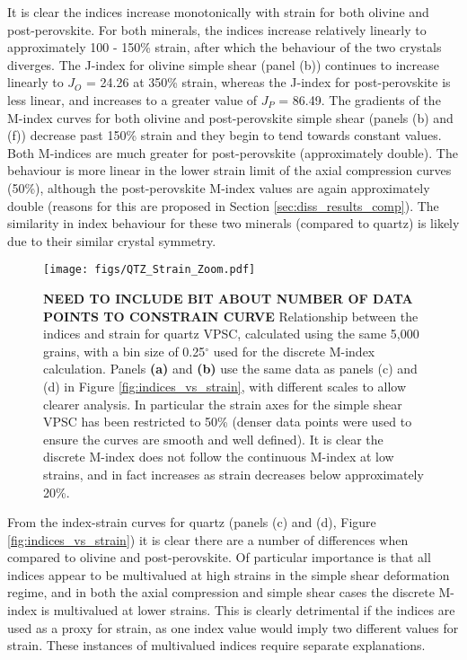 \documentclass[a4paper,12pt,twoside]{report}
\numberwithin{equation}{chapter}
\begin{document}
It is clear the indices increase monotonically with strain for both olivine and post-perovskite. For both minerals, the indices increase relatively linearly to approximately 100 - 150\% strain, after which the behaviour of the two crystals diverges. The J-index for olivine simple shear (panel (b)) continues to increase linearly to $J_O$ = 24.26 at 350\% strain, whereas the J-index for post-perovskite is less linear, and increases to a greater value of $J_P$ = 86.49. The gradients of the M-index curves for both olivine and post-perovskite simple shear (panels (b) and (f)) decrease past 150\% strain and they begin to tend towards constant values. Both M-indices are much greater for post-perovskite (approximately double). The behaviour is more linear in the lower strain limit of the axial compression curves (50\%), although the post-perovskite M-index values are again approximately double (reasons for this are proposed in Section \ref{sec:diss_results_comp}). The similarity in index behaviour for these two minerals (compared to quartz) is likely due to their similar crystal symmetry.

\begin{figure}[h]
  \centering
    \texttt{[image: figs/QTZ\_Strain\_Zoom.pdf]}
  \caption[Relation of indices to strain (quartz VPSC)]{\textbf{NEED TO INCLUDE BIT ABOUT NUMBER OF DATA POINTS TO CONSTRAIN CURVE} Relationship between the indices and strain for quartz VPSC, calculated using the same 5,000 grains, with a bin size of 0.25$^\circ$ used for the discrete M-index calculation. Panels \textbf{(a)} and \textbf{(b)} use the same data as panels (c) and (d) in Figure \ref{fig:indices_vs_strain}, with different scales to allow clearer analysis. In particular the strain axes for the simple shear VPSC has been restricted to 50\% (denser data points were used to ensure the curves are smooth and well defined). It is clear the discrete M-index does not follow the continuous M-index at low strains, and in fact increases as strain decreases below approximately 20\%.}
  \label{fig:indices_vs_strain_qtz}
\end{figure} 

From the index-strain curves for quartz (panels (c) and (d), Figure \ref{fig:indices_vs_strain}) it is clear there are a number of differences when compared to olivine and post-perovskite. Of particular importance is that all indices appear to be multivalued at high strains in the simple shear deformation regime, and in both the axial compression and simple shear cases the discrete M-index is multivalued at lower strains. This is clearly detrimental if the indices are used as a proxy for strain, as one index value would imply two different values for strain. These instances of multivalued indices require separate explanations.
\end{document}
